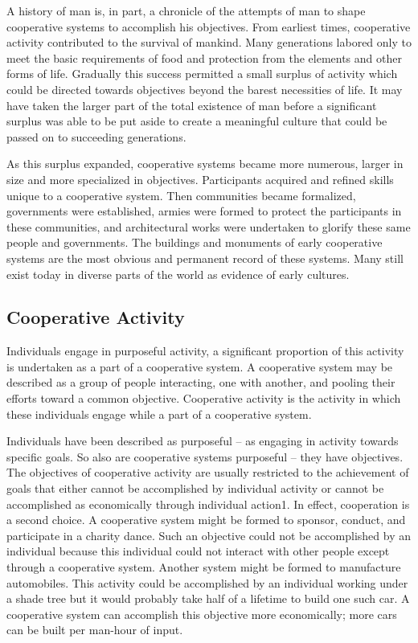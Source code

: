 A history of man is, in part, a chronicle of the attempts of man to shape cooperative systems to accomplish his objectives. From earliest times, cooperative activity contributed to the survival of mankind. Many generations labored only to meet the basic requirements of food and protection from the elements and other forms of life. Gradually this success permitted a small surplus of activity which could be directed towards objectives beyond the barest necessities of life. It may have taken the larger part of the total existence of man before a significant surplus was able to be put aside to create a meaningful culture that could be passed on to succeeding generations.

As this surplus expanded, cooperative systems became more numerous, larger in size and more specialized in objectives. Participants acquired and refined skills unique to a cooperative system. Then communities became formalized, governments were established, armies were formed to protect the participants in these communities, and architectural works were undertaken to glorify these same people and governments. The buildings and monuments of early cooperative systems are the most obvious and permanent record of these systems. Many still exist today in diverse parts of the world as evidence of early cultures.

\subsection{Cooperative Activity}

Individuals engage in purposeful activity, a significant proportion of this activity is undertaken as a part of a cooperative system.
A cooperative system may be described as a group of people interacting, one with another, and pooling their efforts toward a common objective. Cooperative activity is the activity in which these individuals engage while a part of a cooperative system.

Individuals have been described as purposeful – as engaging in activity towards specific goals. So also are cooperative systems purposeful – they have objectives. The objectives of cooperative activity are usually restricted to the achievement of goals that either cannot be accomplished by individual activity or cannot be accomplished as economically through individual action1. In effect, cooperation is a second choice. A cooperative system might be formed to sponsor, conduct, and participate in a charity dance. Such an objective could not be accomplished by an individual because this individual could not interact with other people except through a cooperative system. Another system might be formed to manufacture automobiles. This activity could be accomplished by an individual working under a shade tree but it would probably take half of a lifetime to build one such car. A cooperative system can accomplish this objective more economically; more cars can be built per man-hour of input.

